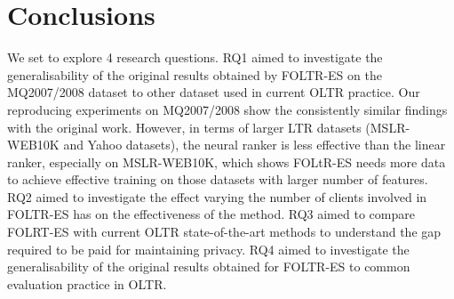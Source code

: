 \section{Conclusions}

We set to explore 4 research questions. RQ1 aimed to investigate the generalisability of the original results obtained  by FOLTR-ES on the MQ2007/2008 dataset to other dataset used in current OLTR practice. Our reproducing experiments on MQ2007/2008 show the consistently similar findings with the original work. However, in terms of larger LTR datasets (MSLR-WEB10K and Yahoo datasets), the neural ranker is less effective than the linear ranker, especially on MSLR-WEB10K, which shows FOLtR-ES needs more data to achieve effective training on those datasets with larger number of features.
RQ2 aimed to investigate the effect varying the number of clients involved in FOLTR-ES has on the effectiveness of the method. 
RQ3 aimed to compare FOLRT-ES with current OLTR state-of-the-art methods to understand the gap required to be paid for maintaining privacy. 
RQ4 aimed to investigate the generalisability of the original results obtained for FOLTR-ES to common evaluation practice in OLTR. 